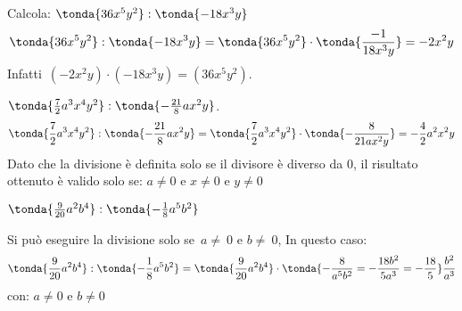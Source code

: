  \begin{esempio}
Calcola: \(\tonda{36x^{5}y^{2}}:\tonda{-18x^{3}y}\)
\[\tonda{36x^{5}y^{2}}:\tonda{-18x^{3}y} =
\tonda{36x^{5}y^{2}} \cdot \tonda{\frac{-1}{18x^{3}y}} =-2x^{2}y\]
Infatti~\((-2x^{2}y)\cdot(-18x^{3}y)=(36x^{5}y^{2})\).
 \end{esempio}
% 
% 
% 
 \begin{esempio}
\(\tonda{\frac{7}{2}a^{3}x^{4}y^{2}}:\tonda{-\frac{21}{8}ax^{2}y}\).
\[\tonda{\frac{7}{2}a^{3}x^{4}y^{2}}:\tonda{-\frac{21}{8}ax^{2}y} =
  \tonda{\frac{7}{2}a^{3}x^{4}y^{2}}\cdot \tonda{-\frac{8}{21ax^{2}y}} =
-\frac{4}{2}a^{2}x^{2}y\]
Dato che la divisione è definita solo se il divisore è diverso da 0, il 
risultato ottenuto è valido solo se:
\(a \neq 0 \text{ e } x \neq 0 \text{ e } y\neq 0\)
 \end{esempio}

 \begin{esempio}
\(\tonda{\frac{9}{20}a^{2}b^{4}}:\tonda{-{\frac{1}{8}}a^{5}b^{2}}\)

Si può eseguire la divisione solo se~\(a\neq~0\text{ e }b\neq~0\), 
In questo caso:
\[\tonda{\frac{9}{20}a^{2}b^{4}}:\tonda{-{\frac{1}{8}}a^{5}b^{2}} =
\tonda{\frac{9}{20}a^{2}b^{4}} \cdot \tonda{-\frac{8}{a^{5}b^{2}} =
-\frac{18b^2}{5a^3} = -\frac{18}{5}}\frac{b^2}{a^3}\]
con: 
\(a \neq 0 \text{ e } b \neq 0\)
 \end{esempio}



